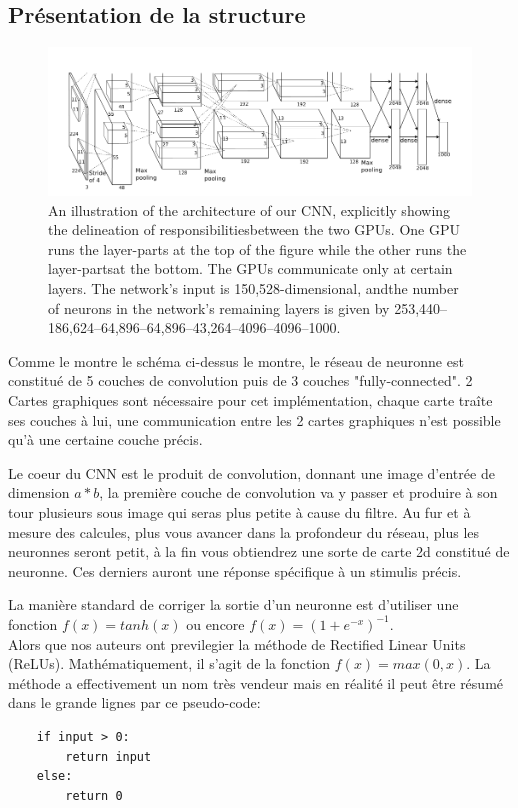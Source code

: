 \documentclass[12pt, letterpaper]{article}
\begin{document}
\subsection{Présentation de la structure}
\begin{figure}[H]
    \includegraphics[width=\linewidth]{img/fig7.png}
    \caption{An illustration of the architecture of our CNN, explicitly showing the delineation of responsibilitiesbetween the two GPUs. One GPU runs the layer-parts at the top of the figure while the other runs the layer-partsat the bottom. The GPUs communicate only at certain layers. The network’s input is 150,528-dimensional, andthe number of neurons in the network’s remaining layers is given by 253,440–186,624–64,896–64,896–43,264–4096–4096–1000.}
    \label{fig:L7}
\end{figure}
Comme le montre le schéma ci-dessus le montre, le réseau de neuronne est constitué de 5 couches de convolution puis de 3 couches "fully-connected".
2 Cartes graphiques sont nécessaire pour cet implémentation, chaque carte traîte ses couches à lui, une communication entre les 2 cartes graphiques n'est 
possible qu'à une certaine couche précis.
\par Le coeur du CNN est le produit de convolution, donnant une image d'entrée de dimension $a*b$, la première couche de convolution va y passer et produire 
à son tour plusieurs sous image qui seras plus petite à cause du filtre. Au fur et à mesure des calcules, plus vous avancer dans la profondeur du réseau, plus les neuronnes seront petit, 
à la fin vous obtiendrez une sorte de carte 2d constitué de neuronne. Ces derniers auront une réponse spécifique à un stimulis précis.
\par La manière standard de corriger la sortie d'un neuronne est d'utiliser une fonction $f(x) = tanh(x)$ ou encore 
$f(x) = (1 + e^{-x})^{-1}$.\\
Alors que nos auteurs ont previlegier la méthode de Rectified Linear Units (ReLUs). \autocite{NairHinton} 
Mathématiquement, il s'agit de la fonction $f(x) = max(0,x)$. La méthode a effectivement un nom très vendeur mais en réalité
il peut être résumé dans le grande lignes par ce pseudo-code:
\begin{verbatim}
    if input > 0:
	    return input
    else:
	    return 0
\end{verbatim}
\end{document}
